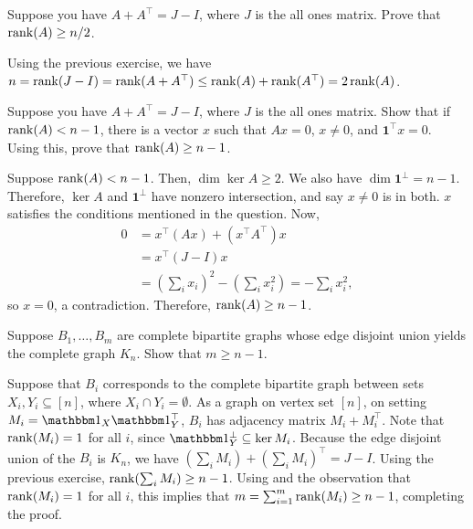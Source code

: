 \documentclass{article}
\begin{document}
	\begin{exercise}
		Suppose you have $A+A^\top = J-I$, where $J$ is the all ones matrix. Prove that $\operatorname{rank}(A) \ge n/2$.
	\end{exercise}
	\begin{solution*}
		Using the previous exercise, we have $n = \operatorname{rank}(J-I) = \operatorname{rank}(A+A^\top) \le \operatorname{rank}(A) + \operatorname{rank}(A^\top) = 2\operatorname{rank}(A)$.
	\end{solution*}

	\begin{exercise}
		\label{ex1.5}
		Suppose you have $A+A^\top = J-I$, where $J$ is the all ones matrix. Show that if $\operatorname{rank}(A) < n-1$, there is a vector $x$ such that $Ax = 0$, $x \ne 0$, and $\mathbf{1}^\top x = 0$. Using this, prove that $\operatorname{rank}(A) \ge n-1$.
	\end{exercise}
	\begin{solution*}
		Suppose $\operatorname{rank}(A) < n-1$. Then, $\dim \ker A \ge 2$. We also have $\dim \mathbf{1}^\perp = n-1$. Therefore, $\ker A$ and $\mathbf{1}^\perp$ have nonzero intersection, and say $x \ne 0$ is in both. $x$ satisfies the conditions mentioned in the question. Now,
		\begin{align*}
			0 &= x^\top (Ax) + (x^\top A^\top) x \\
				&= x^\top (J-I) x \\
				&= \left(\sum_i x_i\right)^2 - \left(\sum_i x_i^2\right) = - \sum_i x_i^2,
		\end{align*}
		so $x = 0$, a contradiction. Therefore, $\operatorname{rank}(A) \ge n-1$.
	\end{solution*}

	\begin{exercise}
		Suppose $B_1,\ldots,B_m$ are complete bipartite graphs whose edge disjoint union yields the complete graph $K_n$. Show that $m \ge n-1$.
	\end{exercise}
	\begin{solution*}
		Suppose that $B_i$ corresponds to the complete bipartite graph between sets $X_i,Y_i \subseteq [n]$, where $X_i \cap Y_i = \emptyset$. As a graph on vertex set $[n]$, on setting $M_i = \indic_X \indic_Y^\top$, $B_i$ has adjacency matrix $M_i + M_i^\top$. Note that $\operatorname{rank}(M_i) = 1$ for all $i$, since $\indic_Y^\perp \subseteq \ker M_i$. Because the edge disjoint union of the $B_i$ is $K_n$, we have $(\sum_i M_i) + (\sum_i M_i)^\top = J-I$. Using the previous exercise, $\operatorname{rank}(\sum_i M_i) \ge n-1$. Using  and the observation that $\operatorname{rank}(M_i) = 1$ for all $i$, this implies that $m = \sum_{i=1}^m \operatorname{rank}(M_i) \ge n-1$, completing the proof.
	\end{solution*}
\end{document}
